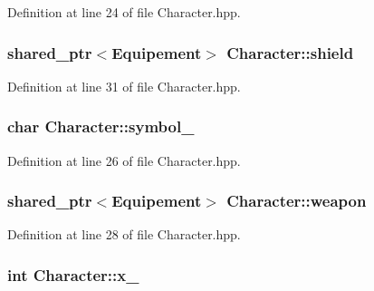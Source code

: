 Definition at line 24 of file Character.\-hpp.

\hypertarget{class_character_ac74a5ebc37ffa8dcc078c2530c0c947a}{
\subsubsection[{shield}]{\setlength{\rightskip}{0pt plus 5cm}shared\-\_\-ptr$<${\bf Equipement}$>$ Character\-::shield\hspace{0.3cm}{\ttfamily [protected]}}}\label{class_character_ac74a5ebc37ffa8dcc078c2530c0c947a}


Definition at line 31 of file Character.\-hpp.

\hypertarget{class_character_af3b304ea19adc493b2daa9bd1e80229d}{
\subsubsection[{symbol\-\_\-}]{\setlength{\rightskip}{0pt plus 5cm}char Character\-::symbol\-\_\-\hspace{0.3cm}{\ttfamily [protected]}}}\label{class_character_af3b304ea19adc493b2daa9bd1e80229d}


Definition at line 26 of file Character.\-hpp.

\hypertarget{class_character_af779f72e2ccbc275350ab80b99136c7c}{
\subsubsection[{weapon}]{\setlength{\rightskip}{0pt plus 5cm}shared\-\_\-ptr$<${\bf Equipement}$>$ Character\-::weapon\hspace{0.3cm}{\ttfamily [protected]}}}\label{class_character_af779f72e2ccbc275350ab80b99136c7c}


Definition at line 28 of file Character.\-hpp.

\hypertarget{class_character_af0ed42181b8730437905b21485879471}{
\subsubsection[{x\-\_\-}]{\setlength{\rightskip}{0pt plus 5cm}int Character\-::x\-\_\-\hspace{0.3cm}{\ttfamily [protected]}}}\label{class_character_af0ed42181b8730437905b21485879471}


